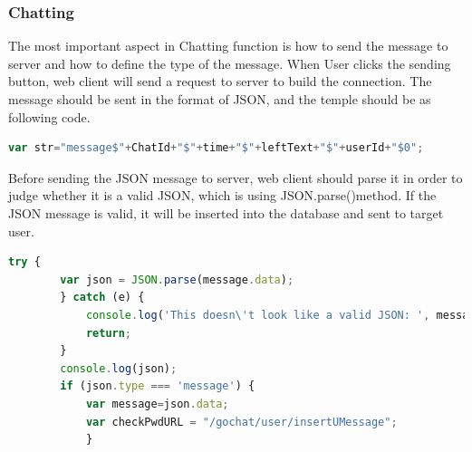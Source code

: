 \documentclass[a4paper,11pt]{article}
\begin{document}
\subsubsection*{Chatting}
The most important aspect in Chatting function is how to send the message to server and how to define the type of the message. When User clicks the sending button, web client will send a request to server to build the connection. The message should be sent in the format of JSON, and the temple should be as following code.   
\begin{lstlisting}[language=javascript]
var str="message$"+ChatId+"$"+time+"$"+leftText+"$"+userId+"$0";
\end{lstlisting}
Before sending the JSON message to server, web client should parse it in order to judge whether it is a valid JSON, which is using JSON.parse()method. If the JSON message is valid, it will be inserted into the database and sent to target user. 
\begin{lstlisting}[language=javascript]
try {
        var json = JSON.parse(message.data);
        } catch (e) {
            console.log('This doesn\'t look like a valid JSON: ', message.data);
            return;
        }
        console.log(json);
        if (json.type === 'message') { 
            var message=json.data;
            var checkPwdURL = "/gochat/user/insertUMessage";
            }
\end{lstlisting}
\end{document}

